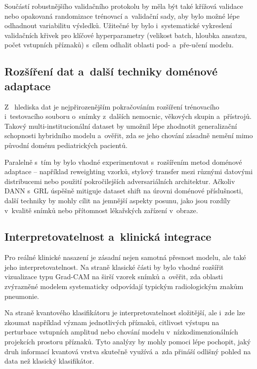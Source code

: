 \documentclass[12pt, a4paper]{report}
\begin{document}
Součástí robustnějšího validačního protokolu by měla být také křížová validace nebo opakovaná randomizace trénovací a~validační sady, aby bylo možné lépe odhadnout variabilitu výsledků. Užitečné by bylo i~systematické vykreslení validačních křivek pro klíčové hyperparametry (velikost batch, hloubka ansatzu, počet vstupních příznaků) s~cílem odhalit oblasti pod- a~pře-učení modelu.

\subsection{Rozšíření dat a~další techniky doménové adaptace}

Z ~hlediska dat je nejpřirozenějším pokračováním rozšíření trénovacího i~testovacího souboru o~snímky z~dalších nemocnic, věkových skupin a~přístrojů. Takový multi-institucionální dataset by umožnil lépe zhodnotit generalizační schopnosti hybridního modelu a~ověřit, zda se jeho chování zásadně nemění mimo původní doménu pediatrických pacientů.

Paralelně s~tím by bylo vhodné experimentovat s~rozšířením metod doménové adaptace -- například reweighting vzorků, stylový transfer mezi různými datovými distribucemi nebo použití pokročilejších adversariálních architektur. Ačkoliv DANN s~GRL úspěšně mitiguje dataset shift na úrovni doménové příslušnosti, další techniky by mohly cílit na jemnější aspekty posunu, jako jsou rozdíly v~kvalitě snímků nebo přítomnost lékařských zařízení v~obraze.

\subsection{Interpretovatelnost a~klinická integrace}

Pro reálné klinické nasazení je zásadní nejen samotná přesnost modelu, ale také jeho interpretovatelnost. Na straně klasické části by bylo vhodné rozšířit vizualizace typu Grad-CAM na širší vzorek snímků a~ověřit, zda oblasti zvýrazněné modelem systematicky odpovídají typickým radiologickým znakům pneumonie.

Na straně kvantového klasifikátoru je interpretovatelnost složitější, ale i~zde lze zkoumat například význam jednotlivých příznaků, citlivost výstupu na perturbace vstupních amplitud nebo chování modelu v~nízkodimenzionálních projekcích prostoru příznaků. Tyto analýzy by mohly pomoci lépe pochopit, jaký druh informací kvantová vrstva skutečně využívá a~zda přináší odlišný pohled na data než klasický klasifikátor.
\end{document}
